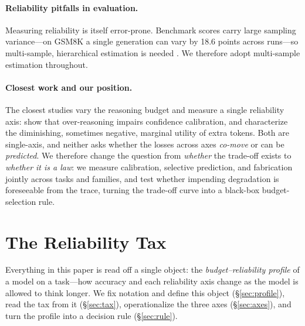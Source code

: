 \documentclass[11pt]{article}
\begin{document}
\paragraph{Reliability pitfalls in evaluation.}
Measuring reliability is itself error-prone.
Benchmark scores carry large sampling variance---on GSM8K a single generation
can vary by 18.6 points across runs---so multi-sample, hierarchical
estimation is needed \citep{Zhang2025BeyondSingular, Miller2024ErrorBars}.
We therefore adopt multi-sample estimation throughout.

\paragraph{Closest work and our position.}
The closest studies vary the reasoning budget and measure a single
reliability axis: \citet{DontThinkTwice2025} show that over-reasoning
impairs confidence calibration, and \citet{WhenMoreThinkingHurts2026}
characterize the diminishing, sometimes negative, marginal utility of extra
tokens.
Both are single-axis, and neither asks whether the losses across axes
\emph{co-move} or can be \emph{predicted}.
We therefore change the question from \emph{whether} the trade-off exists to
\emph{whether it is a law}: we measure calibration, selective prediction, and
fabrication jointly across tasks and families, and test whether
impending degradation is foreseeable from the trace, turning the trade-off
curve into a black-box budget-selection rule.

\section{The Reliability Tax}

Everything in this paper is read off a single object: the
\emph{budget--reliability profile} of a model on a task---how accuracy and
each reliability axis change as the model is allowed to think longer.
We fix notation and define this object (\S\ref{sec:profile}), read the tax
from it (\S\ref{sec:tax}), operationalize the three axes
(\S\ref{sec:axes}), and turn the profile into a decision rule
(\S\ref{sec:rule}).
\end{document}
